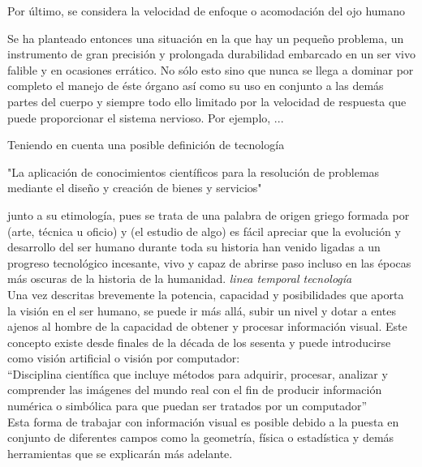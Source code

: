 Por último, se considera la velocidad de enfoque o acomodación del ojo humano



Se ha planteado entonces una situación en la que hay un pequeño problema, un instrumento de gran precisión y prolongada durabilidad embarcado en un ser vivo falible y en ocasiones errático. No sólo esto sino que nunca se llega a dominar por completo el manejo de éste órgano así como su uso en conjunto a las demás partes del cuerpo y siempre todo ello limitado por la velocidad de respuesta que puede proporcionar el sistema nervioso.
Por ejemplo, ...

Teniendo en cuenta una posible definición de tecnología 

"La aplicación de conocimientos científicos para la resolución de problemas mediante el diseño y creación de bienes y servicios" 

junto a su etimología, pues se trata de una palabra de origen griego 
formada por 
(arte, técnica u oficio) y 
(el estudio de algo) es fácil apreciar que la evolución y desarrollo del ser humano durante toda su historia han venido ligadas a un progreso tecnológico incesante, vivo y capaz de abrirse paso incluso en las épocas más oscuras de la historia de la humanidad. 
\textit{linea temporal tecnología}
\\
Una vez descritas brevemente la potencia, capacidad y posibilidades que aporta la visión en el ser humano, se puede ir más allá, subir un nivel y dotar a entes ajenos al hombre de la capacidad de obtener y procesar información visual. Este concepto existe desde finales de la década de los sesenta y puede introducirse como visión artificial o visión por computador: 
\\
“Disciplina científica que incluye métodos para adquirir, procesar, analizar y comprender las imágenes del mundo real con el fin de producir información numérica o simbólica para que puedan ser tratados por un computador”
\\
Esta forma de trabajar con información visual es posible debido a la puesta en conjunto de diferentes campos como la geometría, física o estadística y demás herramientas que se explicarán más adelante.


